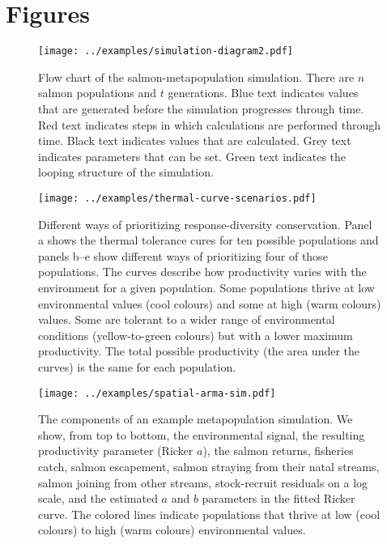 \clearpage

\section{Figures}

\clearpage

\begin{figure}[htbp]
\centering
\texttt{[image: ../examples/simulation-diagram2.pdf]}
\caption{Flow chart of the salmon-metapopulation simulation. There are $n$ salmon populations and $t$ generations. Blue text indicates values that are generated before the simulation progresses through time. Red text indicates steps in which calculations are performed through time. Black text indicates values that are calculated. Grey text indicates parameters that can be set. Green text indicates the looping structure of the simulation.}
\label{f:sim-flow}
\end{figure}

\clearpage

\begin{figure}[htbp]
\centering
\texttt{[image: ../examples/thermal-curve-scenarios.pdf]}
\caption{Different ways of prioritizing response-diversity conservation. Panel a shows the thermal tolerance cures for ten possible populations and panels b--e show different ways of prioritizing four of those populations. The curves describe how productivity varies with the environment for a given population. Some populations thrive at low environmental values (cool colours) and some at high (warm colours) values. Some are tolerant to a wider range of environmental conditions (yellow-to-green colours) but with a lower maximum productivity. The total possible productivity (the area under the curves) is the same for each population.}
\label{f:curves}
\end{figure}

\clearpage

\begin{figure}[htbp]
\centering
\texttt{[image: ../examples/spatial-arma-sim.pdf]}
\caption{The components of an example metapopulation simulation.  We show, from top to bottom, the environmental signal, the resulting productivity parameter (Ricker $a$), the salmon returns, fisheries catch, salmon escapement, salmon straying from their natal streams, salmon joining from other streams, stock-recruit residuals on a log scale, and the estimated $a$ and $b$ parameters in the fitted Ricker curve. The colored lines indicate populations that thrive at low (cool colours) to high (warm colours) environmental values.}
\label{f:sp-eg}
\end{figure}


